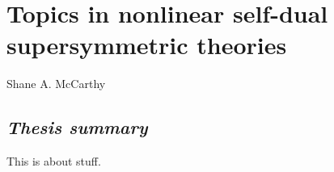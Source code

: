 \documentclass[12pt]{article}
\begin{document}
\thispagestyle{empty}
\section*{Topics in nonlinear self-dual\\ supersymmetric theories}

Shane A. McCarthy

\subsection*{{\it Thesis summary}}

This is about stuff.
\end{document}
